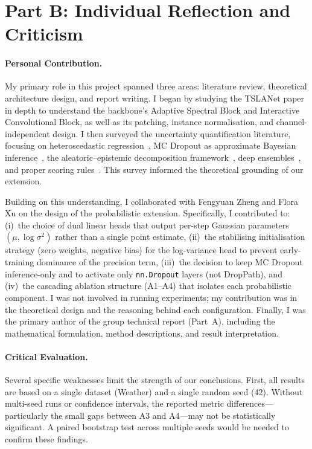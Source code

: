 \documentclass{llncs}
\begin{document}

\section*{Part B: Individual Reflection and Criticism}
\label{sec:partb}

\paragraph{Personal Contribution.}
My primary role in this project spanned three areas: literature review, theoretical architecture design, and report writing. I began by studying the TSLANet paper~\cite{eldele2024tslanet} in depth to understand the backbone's Adaptive Spectral Block and Interactive Convolutional Block, as well as its patching, instance normalisation, and channel-independent design. I then surveyed the uncertainty quantification literature, focusing on heteroscedastic regression~\cite{nix1994estimating}, MC Dropout as approximate Bayesian inference~\cite{gal2016dropout}, the aleatoric--epistemic decomposition framework~\cite{kendall2017uncertainties}, deep ensembles~\cite{lakshminarayanan2017simple}, and proper scoring rules~\cite{gneiting2007strictly}. This survey informed the theoretical grounding of our extension.

Building on this understanding, I collaborated with Fengyuan Zheng and Flora Xu on the design of the probabilistic extension. Specifically, I contributed to: (i)~the choice of dual linear heads that output per-step Gaussian parameters $(\mu, \log\sigma^{2})$ rather than a single point estimate, (ii)~the stabilising initialisation strategy (zero weights, negative bias) for the log-variance head to prevent early-training dominance of the precision term, (iii)~the decision to keep MC Dropout inference-only and to activate only \texttt{nn.Dropout} layers (not DropPath), and (iv)~the cascading ablation structure (A1--A4) that isolates each probabilistic component. I was not involved in running experiments; my contribution was in the theoretical design and the reasoning behind each configuration. Finally, I was the primary author of the group technical report (Part~A), including the mathematical formulation, method descriptions, and result interpretation.

\paragraph{Critical Evaluation.}
Several specific weaknesses limit the strength of our conclusions. First, all results are based on a single dataset (Weather) and a single random seed (42). Without multi-seed runs or confidence intervals, the reported metric differences---particularly the small gaps between A3 and A4---may not be statistically significant. A paired bootstrap test across multiple seeds would be needed to confirm these findings.
\end{document}
